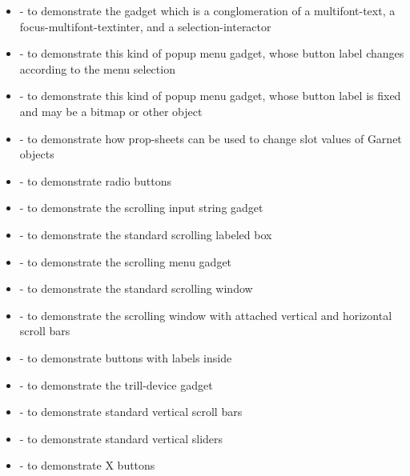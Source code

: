 \begin{itemize}
\item {} 
- to demonstrate the gadget which is a conglomeration of a multifont-text,
a focus-multifont-textinter, and a selection-interactor

\item {} 
- to demonstrate this kind of popup menu gadget, whose button label changes
according to the menu selection

\item {} 
- to demonstrate this kind of popup menu gadget, whose button label is fixed
and may be a bitmap or other object

\item {}
- to demonstrate how prop-sheets can be used to change slot values of Garnet
objects

\item {} 
- to demonstrate radio buttons

\item {}
- to demonstrate the scrolling input string gadget

\item {}
- to demonstrate the standard scrolling labeled box

\item {}
- to demonstrate the scrolling menu gadget

\item {}
- to demonstrate the standard scrolling window

\item {}
- to demonstrate the scrolling window with attached vertical and horizontal
scroll bars

\item {} 
- to demonstrate buttons with labels inside

\item {} 
- to demonstrate the trill-device gadget

\item {} 
- to demonstrate standard vertical scroll bars

\item {} 
- to demonstrate standard vertical sliders

\item {} 
- to demonstrate X buttons

\end{itemize}
